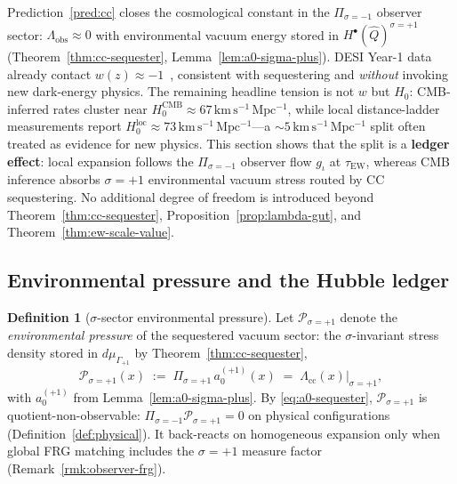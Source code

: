 \documentclass[aps,prd,onecolumn,amsmath,amssymb,nofootinbib,11pt]{revtex4-2}
\numberwithin{equation}{section}
\theoremstyle{plain}
\theoremstyle{definition}
\newtheorem{definition}[theorem]{Definition}
\theoremstyle{remark}
\begin{document}
Prediction~\ref{pred:cc} closes the cosmological constant in the
$\Pi_{\sigma=-1}$ observer sector:
$\Lambda_{\mathrm{obs}}\approx 0$ with environmental vacuum energy stored in
$H^\bullet(\hat Q)^{\sigma=+1}$ (Theorem~\ref{thm:cc-sequester},
Lemma~\ref{lem:a0-sigma-plus}). DESI Year-1 data already contact
$w(z)\approx -1$~\cite{DESI2024}, consistent with sequestering and
\emph{without} invoking new dark-energy physics. The remaining headline tension
is not $w$ but $H_0$: CMB-inferred rates cluster near
$H_0^{\mathrm{CMB}}\approx 67\,\mathrm{km\,s^{-1}\,Mpc^{-1}}$, while local
distance-ladder measurements report
$H_0^{\mathrm{loc}}\approx 73\,\mathrm{km\,s^{-1}\,Mpc^{-1}}$---a
$\sim 5\,\mathrm{km\,s^{-1}\,Mpc^{-1}}$ split often treated as evidence for
new physics. This section shows that the split is a \textbf{ledger effect}:
local expansion follows the $\Pi_{\sigma=-1}$ observer flow $g_\iota$ at
$\tau_{\mathrm{EW}}$, whereas CMB inference absorbs $\sigma=+1$ environmental
vacuum stress routed by CC sequestering. No additional degree of freedom is
introduced beyond Theorem~\ref{thm:cc-sequester},
Proposition~\ref{prop:lambda-gut}, and Theorem~\ref{thm:ew-scale-value}.

\subsection{Environmental pressure and the Hubble ledger}
\label{sec:cosmology:ledger}

\begin{definition}[$\sigma$-sector environmental pressure]
\label{def:env-pressure}
Let $\mathcal{P}_{\sigma=+1}$ denote the \emph{environmental pressure} of the
sequestered vacuum sector: the $\sigma$-invariant stress density stored in
$d\mu_{\Gamma_{+1}}$ by Theorem~\ref{thm:cc-sequester},
\begin{equation}\label{eq:env-pressure}
  \mathcal{P}_{\sigma=+1}(x)
  \;:=\;
  \Pi_{\sigma=+1}\,a_0^{(+1)}(x)
  \;=\;
  \Lambda_{\mathrm{cc}}(x)\big|_{\sigma=+1},
\end{equation}
with $a_0^{(+1)}$ from Lemma~\ref{lem:a0-sigma-plus}. By
\eqref{eq:a0-sequester}, $\mathcal{P}_{\sigma=+1}$ is
quotient-non-observable: $\Pi_{\sigma=-1}\mathcal{P}_{\sigma=+1}=0$ on
physical configurations (Definition~\ref{def:physical}). It back-reacts on
homogeneous expansion only when global FRG matching includes the
$\sigma=+1$ measure factor (Remark~\ref{rmk:observer-frg}).
\end{definition}
\end{document}

